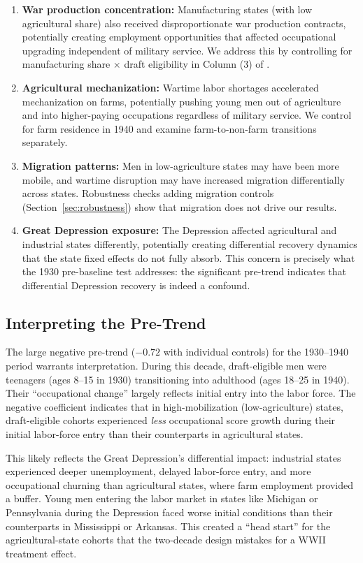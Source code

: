 \documentclass[12pt]{article}
\begin{document}
\begin{enumerate}
\item \textbf{War production concentration:} Manufacturing states (with low agricultural share) also received disproportionate war production contracts, potentially creating employment opportunities that affected occupational upgrading independent of military service. We address this by controlling for manufacturing share $\times$ draft eligibility in Column (3) of .
\item \textbf{Agricultural mechanization:} Wartime labor shortages accelerated mechanization on farms, potentially pushing young men out of agriculture and into higher-paying occupations regardless of military service. We control for farm residence in 1940 and examine farm-to-non-farm transitions separately.
\item \textbf{Migration patterns:} Men in low-agriculture states may have been more mobile, and wartime disruption may have increased migration differentially across states. Robustness checks adding migration controls (Section~\ref{sec:robustness}) show that migration does not drive our results.
\item \textbf{Great Depression exposure:} The Depression affected agricultural and industrial states differently, potentially creating differential recovery dynamics that the state fixed effects do not fully absorb. This concern is precisely what the 1930 pre-baseline test addresses: the significant pre-trend indicates that differential Depression recovery is indeed a confound.
\end{enumerate}

\subsection{Interpreting the Pre-Trend}

The large negative pre-trend ($-0.72$ with individual controls) for the 1930--1940 period warrants interpretation. During this decade, draft-eligible men were teenagers (ages 8--15 in 1930) transitioning into adulthood (ages 18--25 in 1940). Their ``occupational change'' largely reflects initial entry into the labor force. The negative coefficient indicates that in high-mobilization (low-agriculture) states, draft-eligible cohorts experienced \textit{less} occupational score growth during their initial labor-force entry than their counterparts in agricultural states.

This likely reflects the Great Depression's differential impact: industrial states experienced deeper unemployment, delayed labor-force entry, and more occupational churning than agricultural states, where farm employment provided a buffer. Young men entering the labor market in states like Michigan or Pennsylvania during the Depression faced worse initial conditions than their counterparts in Mississippi or Arkansas. This created a ``head start'' for the agricultural-state cohorts that the two-decade design mistakes for a WWII treatment effect.
\end{document}
